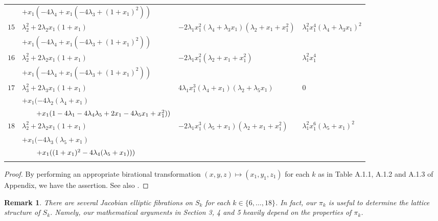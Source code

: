 \documentclass[10pt]{article}
\newtheorem{rem}{Remark}[section]
\begin{document}
{\begin{longtable}{llll}
\vspace{1mm}& $+ x_1 (-4 \lambda_4 + x_1 (-4 \lambda_3 + (1 + x_1)^2))$ && \\
\vspace{0mm}$15$ & $\lambda_2^2 + 2 \lambda_2 x_1 (1 + x_1) $ & $-2 \lambda_1 x_1^2 (\lambda_4 + \lambda_3 x_1) (\lambda_2 + x_1 + x_1^2)$ & $\lambda_1^2 x_1^4 (\lambda_4 + \lambda_3 x_1)^2$\\
\vspace{1mm}&$+ x_1 (-4 \lambda_4 + x_1 (-4 \lambda_3 + (1 + x_1)^2))$ && \\
 \vspace{0mm}$16$ & $\lambda_2^2 + 2 \lambda_2 x_1 (1 + x_1) $ & $-2 \lambda_1 x_1^2 (\lambda_2 + x_1 + x_1^2)$ & $\lambda_1^2 x_1^4$\\
\vspace{1mm} & $+ x_1 (-4 \lambda_4 + x_1 (-4 \lambda_3 + (1 + x_1)^2))$ && \\
  \vspace{0mm}$17$ & $\lambda_3^2 + 2 \lambda_3 x_1 (1 + x_1)  $ & $4 \lambda_1 x_1^3 (\lambda_4 + x_1) (\lambda_2 + \lambda_5 x_1)$ & $0$\\
\vspace{0mm}& $+x_1 (-4 \lambda_2 (\lambda_4 + x_1)  $ & & \\
\vspace{1mm} &$\hspace{7mm}+ x_1 (1 - 4 \lambda_1 - 4 \lambda_4 \lambda_5 + 2 x_1 - 4 \lambda_5 x_1 + x_1^2))$  & & \\
                        $18$ &  $\lambda_2^2 + 2 \lambda_2 x_1 (1 + x_1)  $ & $-2 \lambda_1 x_1^3 (\lambda_5 + x_1) (\lambda_2 + x_1 + x_1^2)$ & $\lambda_1^2 x_1^6 (\lambda_5 + x_1)^2$\\
 &$+ 
 x_1 (-4 \lambda_3 (\lambda_5 + x_1) $ && \\
 & $\hspace{7mm} + x_1 ((1 + x_1)^2 - 4 \lambda_4 (\lambda_5 + x_1)))$ & & \\
\hline\\
\end{longtable} 
}

\begin{proof}
By performing an appropriate birational transformation $(x,y,z)\mapsto (x_1,y_1,z_1) $ for each $k$ 
 as in Table A.1.1, A.1.2 and A.1.3 of Appendix, we have the assertion.
 See also \cite{M1}.
\end{proof}


 \begin{rem}
 There are several Jacobian elliptic fibrations on $S_k$ for each $k\in \{6,\ldots,18\}$.
 In fact, our $\pi_k$ is useful  to determine the lattice structure of $S_k$.
Namely, our mathematical arguments in Section 3, 4  and 5  heavily depend on the properties of $\pi_k$.
  \end{rem}
\end{document}
